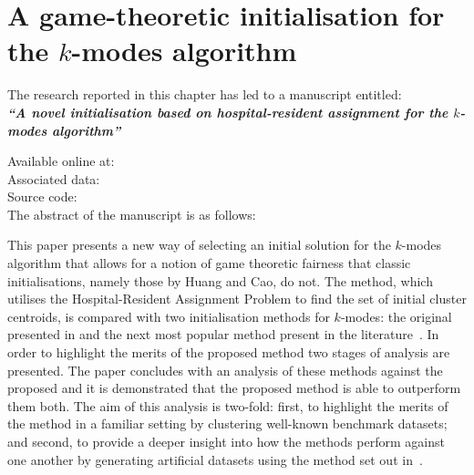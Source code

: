 \chapter{A game-theoretic initialisation for the \(k\)-modes algorithm}%
\label{chp:kmodes}

\graphicspath{{chapters/kmodes/paper/img/}}
\renewcommand{\algpath}{chapters/kmodes/paper/tex/algorithms}
\renewcommand{\texpath}{chapters/kmodes/paper/tex}

\begin{center}
    The research reported in this chapter has led to a manuscript
    entitled:\\[1em]

    {%
        \bf\itshape{``A novel initialisation based on hospital-resident
                    assignment for the \(k\)-modes algorithm''}
    }

    Available online at: \\

    Associated data: \\
    Source code: \\[1em]

    The abstract of the manuscript is as follows:\\[1em]
\end{center}

This paper presents a new way of selecting an initial solution for the
\(k\)-modes algorithm that allows for a notion of game theoretic fairness that
classic initialisations, namely those by Huang and Cao, do not. The method,
which utilises the Hospital-Resident Assignment Problem to find the set of
initial cluster centroids, is compared with two initialisation methods for
\(k\)-modes: the original presented in \cite{Huang1998} and the next most
popular method present in the literature~\cite{Cao2009}. In order to highlight
the merits of the proposed method two stages of analysis are presented. The
paper concludes with an analysis of these methods against the proposed and it is
demonstrated that the proposed method is able to outperform them both. The aim
of this analysis is two-fold: first, to highlight the merits of the method in a
familiar setting by clustering well-known benchmark datasets; and second, to
provide a deeper insight into how the methods perform against one another by
generating artificial datasets using the method set out in~\cite{Wilde2019}.

\myrule%

